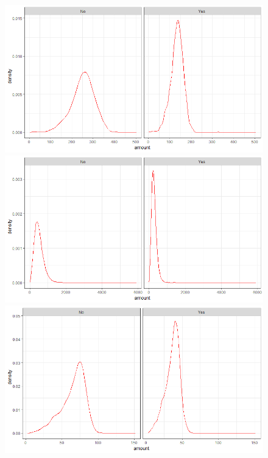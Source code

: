 \documentclass[12pt]{article}
\begin{document}
	\begin{figure}[h]
		\includegraphics[scale=0.40]{Img/prepostmuntligsporsmal.PNG}
		\includegraphics[scale=0.40]{Img/prepostskriftligsporsmal.PNG}
		\includegraphics[scale=0.40]{Img/prepostsporretimesporsmal.PNG}
	\end{figure}
	
\end{document}
